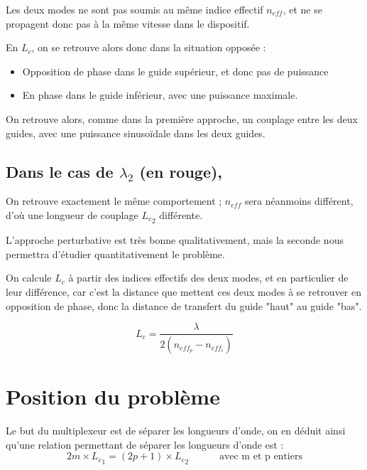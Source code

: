 \documentclass[a4paper,11pt]{report}
\begin{document}
Les deux modes ne sont pas soumis au même indice effectif $n_{eff}$, et ne se propagent donc pas à la même vitesse dans le dispositif.

En $L_c$, on se retrouve alors donc dans la situation opposée :
\begin{itemize}
    \item Opposition de phase dans le guide supérieur, et donc pas de puissance
    \item En phase dans le guide inférieur, avec une puissance maximale.
    \newline
\end{itemize}

On retrouve alors, comme dans la première approche, un couplage entre les deux guides, avec une puissance sinusoïdale dans les deux guides.

\subsection*{Dans le cas de $\lambda_2$ (en rouge),}
On retrouve exactement le même comportement ; $n_{eff}$ sera néanmoins différent, d'où une longueur de couplage ${L_c}_2$ différente.
\newline

L'approche perturbative est très bonne qualitativement, mais la seconde nous permettra d'étudier quantitativement le problème.

On calcule $L_c$ à partir des indices effectifs des deux modes, et en particulier de leur différence, car c'est la distance que mettent ces deux modes à se retrouver en opposition de phase, donc la distance de transfert du guide "haut" au guide "bas".

\begin{equation}
    L_c=\dfrac{\lambda}{2(n_{eff_p}-n_{eff_i})}
\end{equation}




\section{Position du problème}

Le but du multiplexeur est de séparer les longueurs d'onde, on en déduit ainsi qu'une relation permettant de séparer les longueurs d'onde est :
\begin{equation}
    2m\times{L_c}_1=(2p+1)\times{L_c}_2\,\,\hspace{1cm}\text{   avec m et p entiers}
\end{equation}
\end{document}
